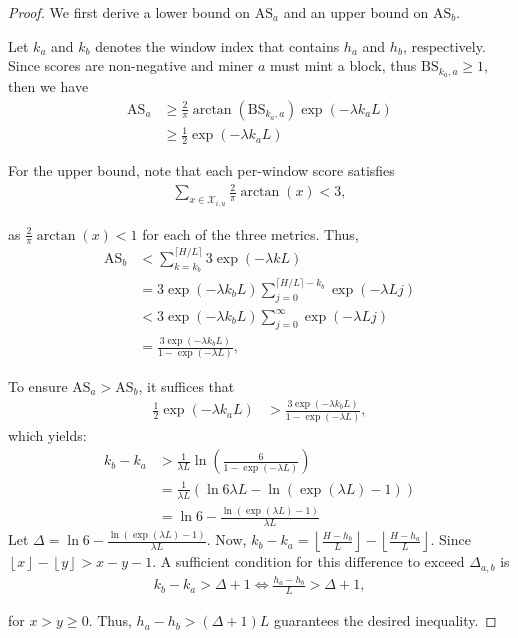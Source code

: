 \documentclass[journal]{IEEEtran}
\begin{document}
\begin{proof}
We first derive a lower bound on $\text{AS}_a$ and an upper bound on $\text{AS}_b$.

Let $k_a$ and $k_b$ denotes the window index that contains $h_a$ and $h_b$, respectively. Since scores are non-negative and miner $a$ must mint a block, thus $\text{BS}_{k_a,a}\ge 1$, then we have
\begin{align}
    \text{AS}_a &\geq \frac{2}{\pi}\arctan(\text{BS}_{k_a,a}) \exp(-\lambda k_a L) \nonumber\\
    &\geq \frac{1}{2} \exp(-\lambda k_a L)
\end{align}

For the upper bound, note that each per-window score satisfies
\begin{align}
    \sum_{x \in \mathcal{X}_{i,u}} \frac{2}{\pi} \arctan(x) < 3,
\end{align}

as $\frac{2}{\pi} \arctan(x) < 1$ for each of the three metrics. Thus,
\begin{align}
\text{AS}_b 
&< \sum_{k = k_b}^{\lceil H/L \rceil} 3 \exp(-\lambda k L)\nonumber \\
&= 3 \exp(-\lambda k_b L) \sum_{j=0}^{\lceil H/L \rceil - k_b} \exp(-\lambda L j)\nonumber \\
&< 3 \exp(-\lambda k_b L) \sum_{j=0}^{\infty} \exp(-\lambda L j)\nonumber \\
&=   \frac{3 \exp(-\lambda k_b L)}{1 - \exp(-\lambda L)},
\end{align}

To ensure $\text{AS}_a > \text{AS}_b$, it suffices that
\begin{align}
\frac{1}{2} \exp(-\lambda k_a L) &> \frac{3 \exp(-\lambda k_b L)}{1 - \exp(-\lambda L)},
\end{align}
which yields:
\begin{align}
k_b - k_a &> \frac{1}{\lambda L} \ln \left( \frac{6}{1 - \exp(-\lambda L)} \right)\nonumber \\
&=\frac{1}{\lambda L}(\ln6 \lambda L - \ln(\exp(\lambda L) - 1))\nonumber\\
&= \ln 6 - \frac{\ln(\exp(\lambda L) - 1)}{\lambda L}
\end{align}
Let $ \Delta = \ln 6 - \frac{\ln(\exp(\lambda L) - 1)}{\lambda L}$.
Now, $k_b - k_a = \left\lfloor \frac{H - h_b}{L} \right\rfloor - \left\lfloor \frac{H - h_a}{L} \right\rfloor$. Since $\left\lfloor x \right\rfloor - \left\lfloor y \right\rfloor > x - y - 1$. A sufficient condition for this difference to exceed $\Delta_{a,b}$ is
\begin{align}
k_b - k_a > \Delta + 1 
\iff \frac{h_a - h_b}{L} > \Delta + 1,
\end{align}

for $x > y \geq 0$. Thus, $h_a - h_b > (\Delta + 1) L$ guarantees the desired inequality.
\end{proof}
\end{document}
